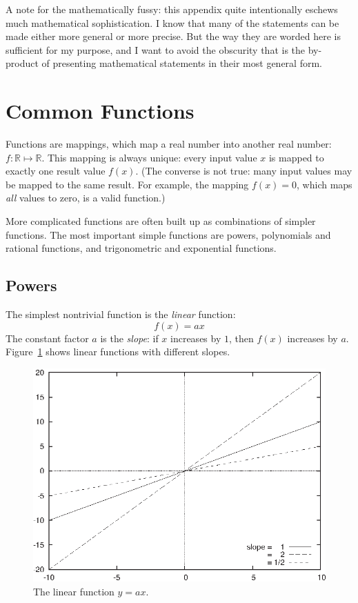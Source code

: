 A note for the mathematically fussy: this appendix quite intentionally
eschews much mathematical sophistication. I know that many of the
statements can be made either more general or more precise. But the
way they are worded here is sufficient for my purpose, and I want to
avoid the obscurity that is the by-product of presenting mathematical
statements in their most general form.\vspace*{-5pt}


\section{Common Functions}

Functions are mappings, which map a real number into another real
number: $f : \mathbb{R} \mapsto \mathbb{R}$. This mapping is always
unique: every input value $x$ is mapped to exactly one result value
$f(x)$. (The converse is not true: many input values may be mapped to
the same result. For example, the mapping $f(x) = 0$, which maps
\emph{all} values to zero, is a valid function.)

More complicated functions are often built up as combinations of
simpler functions. The most important simple functions are powers,
polynomials and rational functions, and trigonometric and exponential
functions.\vspace*{-5pt}

\subsection{Powers}

 
The simplest nontrivial function is the \emph{linear} function:  
%
\[
f(x) = a x
\]
%
The constant factor $a$ is the \emph{slope}: if $x$ increases by $1$,
then $f(x)$ increases by $a$. Figure~\ref{fig:linear} shows linear
functions with different slopes.

\begin{figure}
  \centerline{\includegraphics{img/linear}}
  \caption{The linear function $y = ax$.}
  \label{fig:linear}
\end{figure}

